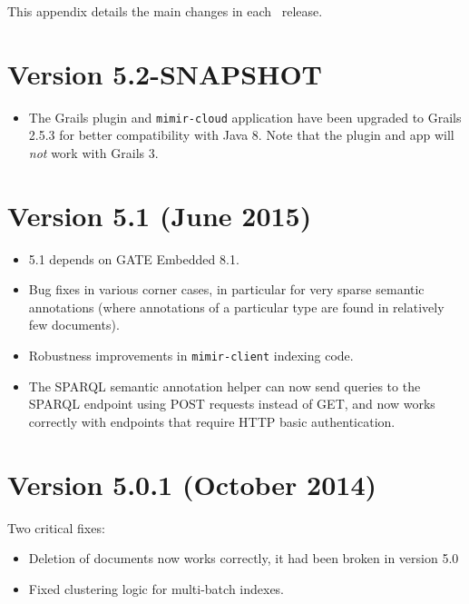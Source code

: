 This appendix details the main changes in each \Mimir\ release.

\section{Version 5.2-SNAPSHOT}
\begin{itemize}
\item The Grails plugin and \verb!mimir-cloud! application have been upgraded
  to Grails 2.5.3 for better compatibility with Java 8.  Note that the plugin
  and app will \emph{not} work with Grails 3.
\end{itemize}

\section{Version 5.1 (June 2015)}
\begin{itemize}
\item \Mimir{} 5.1 depends on GATE Embedded 8.1.
\item Bug fixes in various corner cases, in particular for very sparse semantic
  annotations (where annotations of a particular type are found in relatively
  few documents).
\item Robustness improvements in \verb!mimir-client! indexing code.
\item The SPARQL semantic annotation helper can now send queries to the SPARQL
  endpoint using POST requests instead of GET, and now works correctly with
  endpoints that require HTTP basic authentication.
\end{itemize}

\section{Version 5.0.1 (October 2014)}
Two critical fixes:
\begin{itemize}
  \item Deletion of documents now works correctly, it had been broken in
  version 5.0
  \item Fixed clustering logic for multi-batch indexes.
\end{itemize}


